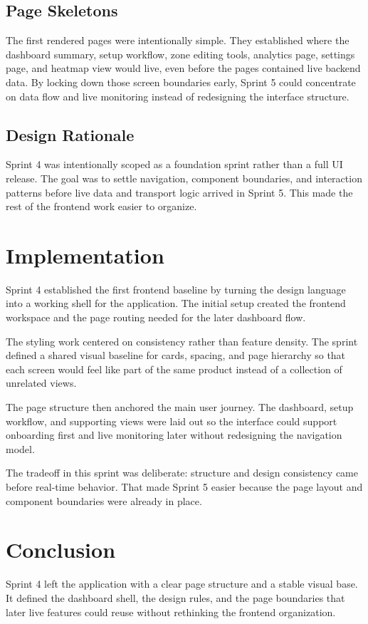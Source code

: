 \subsection{Page Skeletons}
The first rendered pages were intentionally simple. They established where the dashboard summary, setup workflow, zone editing tools, analytics page, settings page, and heatmap view would live, even before the pages contained live backend data. By locking down those screen boundaries early, Sprint 5 could concentrate on data flow and live monitoring instead of redesigning the interface structure.

\subsection{Design Rationale}
Sprint 4 was intentionally scoped as a foundation sprint rather than a full UI release. The goal was to settle navigation, component boundaries, and interaction patterns before live data and transport logic arrived in Sprint 5. This made the rest of the frontend work easier to organize.

\section{Implementation}
Sprint 4 established the first frontend baseline by turning the design language into a working shell for the application. The initial setup created the frontend workspace and the page routing needed for the later dashboard flow.

The styling work centered on consistency rather than feature density. The sprint defined a shared visual baseline for cards, spacing, and page hierarchy so that each screen would feel like part of the same product instead of a collection of unrelated views.

The page structure then anchored the main user journey. The dashboard, setup workflow, and supporting views were laid out so the interface could support onboarding first and live monitoring later without redesigning the navigation model.

The tradeoff in this sprint was deliberate: structure and design consistency came before real-time behavior. That made Sprint 5 easier because the page layout and component boundaries were already in place.

\section{Conclusion}
Sprint 4 left the application with a clear page structure and a stable visual base. It defined the dashboard shell, the design rules, and the page boundaries that later live features could reuse without rethinking the frontend organization.
